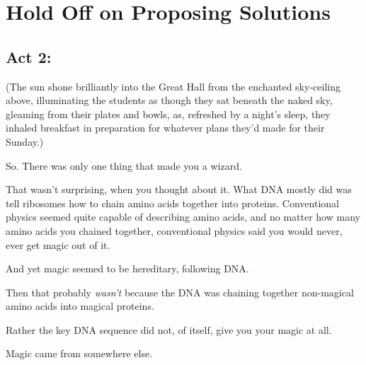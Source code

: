 \chapter{Hold Off on Proposing Solutions}

\section{Act 2:\protect\footnotemark}

(The sun shone brilliantly into the Great Hall from the enchanted sky-ceiling above, illuminating the students as though they sat beneath the naked sky, gleaming from their plates and bowls, as, refreshed by a night’s sleep, they inhaled breakfast in preparation for whatever plans they’d made for their Sunday.)

So. There was only one thing that made you a wizard.

That wasn’t surprising, when you thought about it. What DNA mostly did was tell ribosomes how to chain amino acids together into proteins. Conventional physics seemed quite capable of describing amino acids, and no matter how many amino acids you chained together, conventional physics said you would never, ever get magic out of it.

And yet magic seemed to be hereditary, following DNA.

Then that probably \emph{wasn’t} because the DNA was chaining together non-magical amino acids into magical proteins.

Rather the key DNA sequence did not, of itself, give you your magic at all.

Magic came from somewhere else.

